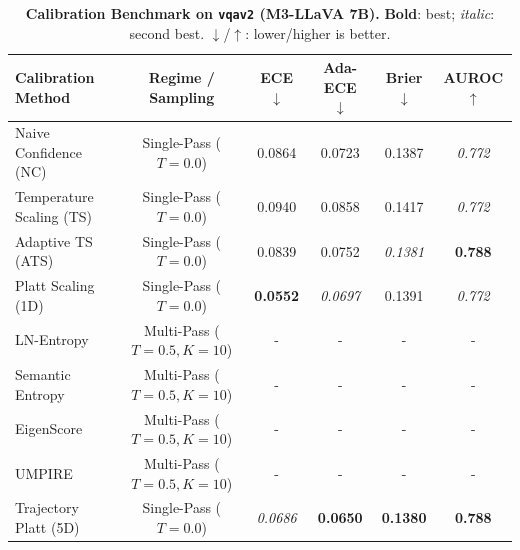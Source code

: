 \begin{table}[t]
\setlength{\tabcolsep}{4pt}
\renewcommand{\arraystretch}{1.05}
\centering
\footnotesize
\begin{tabular}{lccccc}
\toprule
\textbf{Calibration Method} & \textbf{Regime / Sampling} & \textbf{ECE} $\downarrow$ & \textbf{Ada-ECE} $\downarrow$ & \textbf{Brier} $\downarrow$ & \textbf{AUROC} $\uparrow$ \\
\midrule
Naive Confidence (NC) & Single-Pass ($T = 0.0$) & 0.0864 & 0.0723 & 0.1387 & \textit{0.772} \\
Temperature Scaling (TS) & Single-Pass ($T = 0.0$) & 0.0940 & 0.0858 & 0.1417 & \textit{0.772} \\
Adaptive TS (ATS) & Single-Pass ($T = 0.0$) & 0.0839 & 0.0752 & \textit{0.1381} & \textbf{0.788} \\
Platt Scaling (1D) & Single-Pass ($T = 0.0$) & \textbf{0.0552} & \textit{0.0697} & 0.1391 & \textit{0.772} \\
LN-Entropy & Multi-Pass ($T = 0.5, K = 10$) & - & - & - & - \\
Semantic Entropy & Multi-Pass ($T = 0.5, K = 10$) & - & - & - & - \\
EigenScore & Multi-Pass ($T = 0.5, K = 10$) & - & - & - & - \\
UMPIRE & Multi-Pass ($T = 0.5, K = 10$) & - & - & - & - \\
Trajectory Platt (5D) & Single-Pass ($T = 0.0$) & \textit{0.0686} & \textbf{0.0650} & \textbf{0.1380} & \textbf{0.788} \\
\bottomrule
\end{tabular}
\caption{\textbf{Calibration Benchmark on \texttt{vqav2} (M3-LLaVA 7B).} \textbf{Bold}: best; \textit{italic}: second best. $\downarrow$/$\uparrow$: lower/higher is better.}
\label{tab:benchmark_m3_vqav2}
\end{table}

